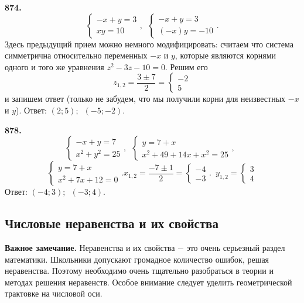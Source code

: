 \textbf{874.}  $$\begin{cases}-x+y=3\\ xy=10 \end{cases},\enspace \begin{cases}-x+y=3\\ (-x)y=-10 \end{cases}.$$ Здесь предыдущий прием можно немного модифицировать: считаем что система симметрична относительно переменных $-x$ и  $y$, которые являются корнями одного и того же уравнения \newline$z^2-3z-10=0$. Решим его  $$z_{1,2}=\frac{3\pm7}{2}=\begin{cases}-2\\ 5 \end{cases}$$ и запишем ответ (только не забудем, что мы получили корни для неизвестных $-x$ и $y$). \newline \null \hspace*{\fill} Ответ: $(2;5);\enspace(-5;-2)$. 

\textbf{878.} $$\begin{cases}-x+y=7\\ x^2+y^2=25 \end{cases},\enspace \begin{cases}y=7+x\\ x^2+49+14x+x^2=25 \end{cases},\enspace $$$$\begin{cases}y=7+x\\ x^2+7x+12=0 \end{cases}.x_{1,2}=\frac{-7\pm1}{2}=\begin{cases}-4\\-3 \end{cases}.\enspace y_{1,2}=\begin{cases}3\\4 \end{cases}$$ \newline \null \hspace*{\fill} Ответ: $(-4;3);\enspace(-3;4)$.


\subsection{Числовые неравенства и их свойства}


\textbf{Важное замечание.} Неравенства и их свойства $-$ это очень серьезный раздел математики. Школьники допускают громадное количество ошибок, решая неравенства. Поэтому необходимо очень тщательно разобраться в теории и методах решения неравенств. Особое внимание следует уделить геометрической трактовке на числовой оси.

